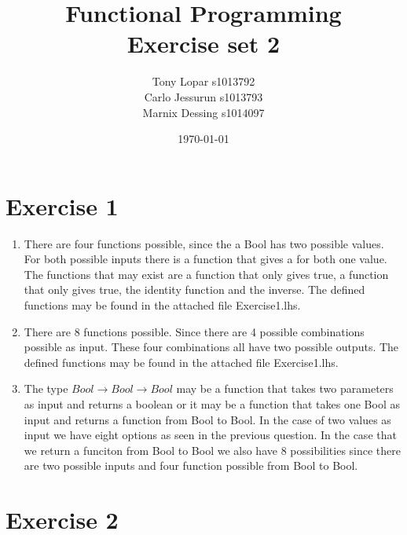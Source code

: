\documentclass{article}
\begin{document}
\title{Functional Programming \\ Exercise set 2}
\date{\today}
\author{Tony Lopar s1013792 \\ Carlo Jessurun s1013793 \\ Marnix Dessing s1014097}
\maketitle

\section*{Exercise 1}
\begin{enumerate}
  \item There are four functions possible, since the a Bool has two possible values. For both possible inputs there is a function that gives a for both one value. The functions that may exist are a function that only gives true, a function that only gives true, the identity function and the inverse. The defined functions may be found in the attached file Exercise1.lhs.
  \item There are 8 functions possible. Since there are 4 possible combinations possible as input. These four combinations all have two possible outputs. The defined functions may be found in the attached file Exercise1.lhs.
  \item The type $Bool \rightarrow Bool \rightarrow Bool$ may be a function that takes two parameters as input and returns a boolean or it may be a function that takes one Bool as input and returns a function from Bool to Bool. In the case of two values as input we have eight options as seen in the previous question. In the case that we return a funciton from Bool to Bool we also have 8 possibilities since there are two possible inputs and four function possible from Bool to Bool.
\end{enumerate}

\section*{Exercise 2}

\newpage
\end{document}
